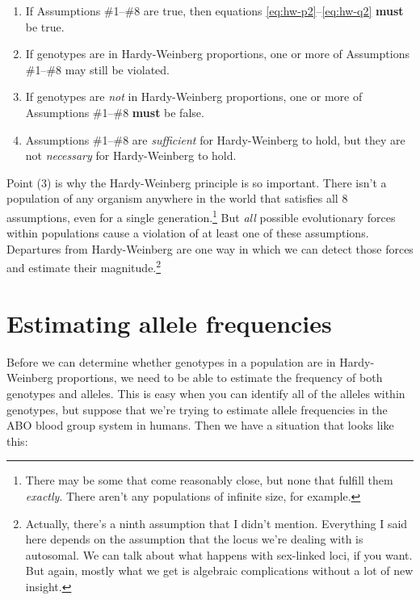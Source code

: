 \documentclass[12pt]{article}
\begin{document}
\begin{enumerate}

\item If Assumptions \#1--\#8 are true, then equations
  \ref{eq:hw-p2}--\ref{eq:hw-q2} {\bf must} be true.

\item If genotypes are in Hardy-Weinberg proportions, one or more of
  Assumptions \#1--\#8 may still be violated.

\item If genotypes are {\it not\/} in Hardy-Weinberg proportions, one
  or more of Assumptions \#1--\#8 {\bf must} be false.

\item Assumptions \#1--\#8 are {\it sufficient\/} for Hardy-Weinberg
  to hold, but they are not {\it necessary\/} for Hardy-Weinberg to
  hold.

\end{enumerate}

Point (3) is why the Hardy-Weinberg principle is so important. There
isn't a population of any organism anywhere in the world that
satisfies all 8 assumptions, even for a single
generation.\footnote{There may be some that come reasonably close, but
  none that fulfill them {\it exactly}. There aren't any populations
  of infinite size, for example.}  But {\it all\/} possible
evolutionary forces within populations cause a violation of at least
one of these assumptions. Departures from Hardy-Weinberg are one way
in which we can detect those forces and estimate their
magnitude.\footnote{Actually, there's a ninth assumption that I didn't
  mention. Everything I said here depends on the assumption that the
  locus we're dealing with is autosomal. We can talk about what
  happens with sex-linked loci, if you want. But again, mostly what we
  get is algebraic complications without a lot of new insight.}

\section*{Estimating allele frequencies}

Before we can determine whether genotypes in a population are in
Hardy-Weinberg proportions, we need to be able to estimate the
frequency of both genotypes and alleles. This is easy when you can
identify all of the alleles within genotypes, but suppose that we're
trying to estimate allele frequencies in the ABO blood group system in
humans. Then we have a situation that looks like this:
\end{document}
